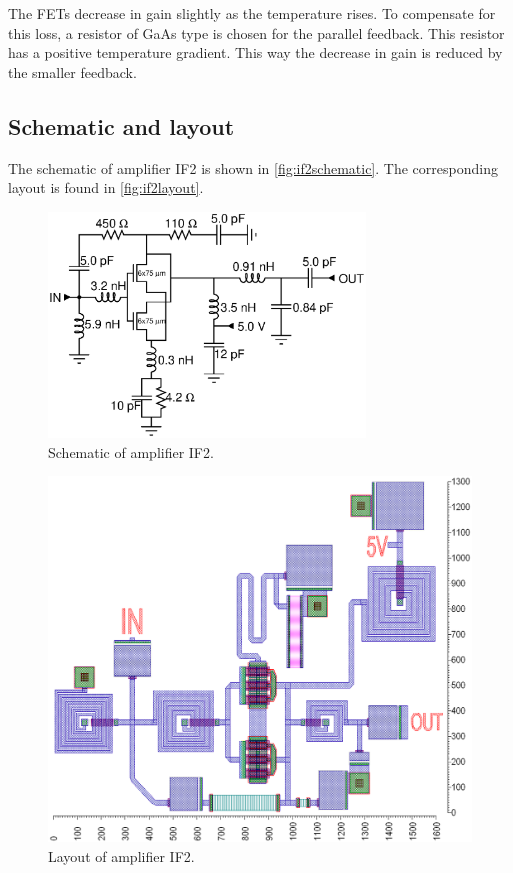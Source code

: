 				The FETs decrease in gain slightly as the temperature rises. To compensate for this loss, a resistor of GaAs type is chosen for the parallel feedback. This resistor has a positive temperature gradient. This way the decrease in gain is reduced by the smaller feedback.

		\subsection{Schematic and layout}
			The schematic of amplifier IF2 is shown in \autoref{fig:if2schematic}. The corresponding layout is found in \autoref{fig:if2layout}.

			\begin{figure}[hbt!]
				\centering
				\includegraphics[width=0.75\textwidth]{fig/amplifiers/if2/sch_if2}
				\caption[Amplifier IF2 schematic.]{Schematic of amplifier IF2.}\label{fig:if2schematic}
			\end{figure}

			\begin{figure}[hbt!]
				\centering
				\includegraphics[width=1.0\textwidth]{fig/amplifiers/if2/layout}
				\caption[Amplifier IF2 layout.]{Layout of amplifier IF2.\scalemum}\label{fig:if2layout}
			\end{figure}

